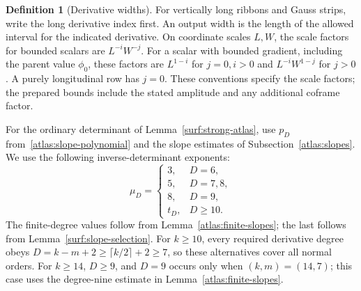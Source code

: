 \documentclass[11pt]{amsart}
\theoremstyle{definition}
\newtheorem{definition}{Definition}[section]
\theoremstyle{remark}
\numberwithin{equation}{section}
\begin{document}
\begin{definition}[Derivative widths]\label{def:derivative-widths}
For vertically long ribbons and Gauss strips, write the long derivative index first. An output width is the length of the allowed interval for the indicated derivative. On coordinate scales $L,W$, the scale factors for bounded scalars are $L^{-i}W^{-j}$. For a scalar with bounded gradient, including the parent value $\phi_0$, these factors are $L^{1-i}$ for $j=0,i>0$ and $L^{-i}W^{1-j}$ for $j>0$. A purely longitudinal row has $j=0$. These conventions specify the scale factors; the prepared bounds include the stated amplitude and any additional coframe factor.
\end{definition}

For the ordinary determinant of Lemma~\ref{surf:strong-atlas}, use $p_D$ from~\eqref{atlas:slope-polynomial} and the slope estimates of Subsection~\ref{atlas:slopes}. We use the following inverse-determinant exponents:
\begin{equation}\label{surf:mu}
 \mu_D=\begin{cases}3,&D=6,\\5,&D=7,8,\\8,&D=9,\\t_D,&D\ge10.\end{cases}
\end{equation}
The finite-degree values follow from Lemma~\ref{atlas:finite-slopes}; the last follows from Lemma~\ref{surf:slope-selection}. For $k\ge10$, every required derivative degree obeys $D=k-m+2\ge\lceil k/2\rceil+2\ge7$, so these alternatives cover all normal orders. For $k\ge14$, $D\ge9$, and $D=9$ occurs only when $(k,m)=(14,7)$; this case uses the degree-nine estimate in Lemma~\ref{atlas:finite-slopes}.
\end{document}
